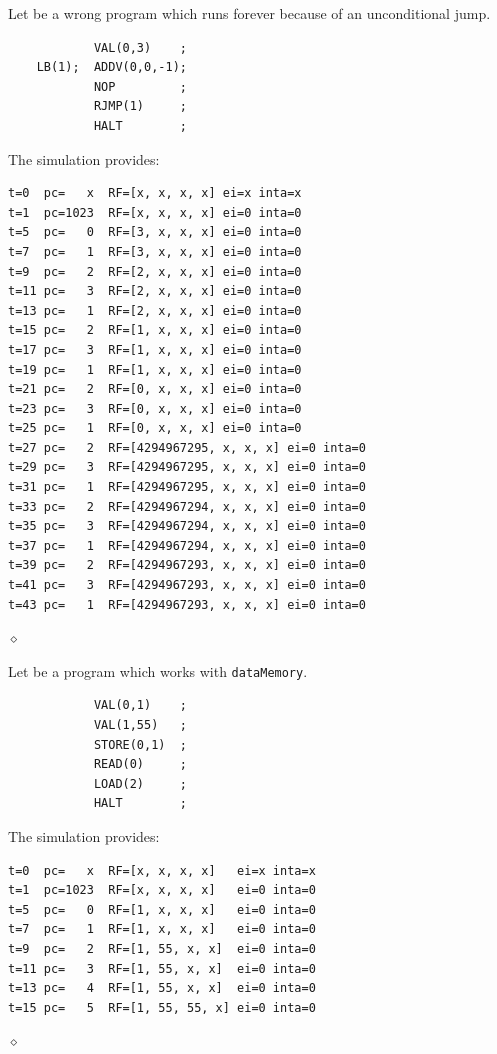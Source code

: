 \begin{exemplu}
Let be a wrong program which runs forever because of an unconditional jump.
{\small
\begin{verbatim}
            VAL(0,3)    ;
    LB(1);  ADDV(0,0,-1);
            NOP         ;
            RJMP(1)     ;
            HALT        ;
\end{verbatim}
}
The simulation provides:
{\small
\begin{verbatim}
t=0  pc=   x  RF=[x, x, x, x] ei=x inta=x
t=1  pc=1023  RF=[x, x, x, x] ei=0 inta=0
t=5  pc=   0  RF=[3, x, x, x] ei=0 inta=0
t=7  pc=   1  RF=[3, x, x, x] ei=0 inta=0
t=9  pc=   2  RF=[2, x, x, x] ei=0 inta=0
t=11 pc=   3  RF=[2, x, x, x] ei=0 inta=0
t=13 pc=   1  RF=[2, x, x, x] ei=0 inta=0
t=15 pc=   2  RF=[1, x, x, x] ei=0 inta=0
t=17 pc=   3  RF=[1, x, x, x] ei=0 inta=0
t=19 pc=   1  RF=[1, x, x, x] ei=0 inta=0
t=21 pc=   2  RF=[0, x, x, x] ei=0 inta=0
t=23 pc=   3  RF=[0, x, x, x] ei=0 inta=0
t=25 pc=   1  RF=[0, x, x, x] ei=0 inta=0
t=27 pc=   2  RF=[4294967295, x, x, x] ei=0 inta=0
t=29 pc=   3  RF=[4294967295, x, x, x] ei=0 inta=0
t=31 pc=   1  RF=[4294967295, x, x, x] ei=0 inta=0
t=33 pc=   2  RF=[4294967294, x, x, x] ei=0 inta=0
t=35 pc=   3  RF=[4294967294, x, x, x] ei=0 inta=0
t=37 pc=   1  RF=[4294967294, x, x, x] ei=0 inta=0
t=39 pc=   2  RF=[4294967293, x, x, x] ei=0 inta=0
t=41 pc=   3  RF=[4294967293, x, x, x] ei=0 inta=0
t=43 pc=   1  RF=[4294967293, x, x, x] ei=0 inta=0
\end{verbatim}
}

$\diamond$
\end{exemplu}


\begin{exemplu}
Let be a  program which works with {\tt dataMemory}.
{\small
\begin{verbatim}
            VAL(0,1)    ;
            VAL(1,55)   ;
            STORE(0,1)  ;
            READ(0)     ;
            LOAD(2)     ;
            HALT        ;
\end{verbatim}
}
The simulation provides:
{\small
\begin{verbatim}
t=0  pc=   x  RF=[x, x, x, x]   ei=x inta=x
t=1  pc=1023  RF=[x, x, x, x]   ei=0 inta=0
t=5  pc=   0  RF=[1, x, x, x]   ei=0 inta=0
t=7  pc=   1  RF=[1, x, x, x]   ei=0 inta=0
t=9  pc=   2  RF=[1, 55, x, x]  ei=0 inta=0
t=11 pc=   3  RF=[1, 55, x, x]  ei=0 inta=0
t=13 pc=   4  RF=[1, 55, x, x]  ei=0 inta=0
t=15 pc=   5  RF=[1, 55, 55, x] ei=0 inta=0
\end{verbatim}
}

$\diamond$
\end{exemplu}





